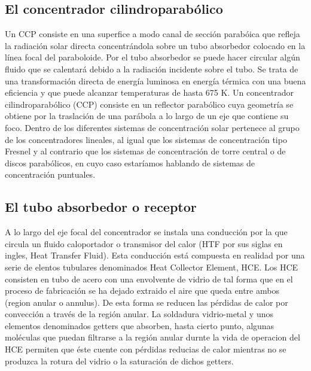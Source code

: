 \subsection{El concentrador cilindroparabólico}
\label{concentrador}
Un CCP consiste en una superfice a modo canal  de sección parabóica que refleja la radiación solar directa
concentrándola sobre un tubo absorbedor colocado en la línea focal del paraboloide. Por el tubo
absorbedor se puede hacer circular algún fluido que se calentará debido a la radiación incidente
sobre el tubo.  Se trata de una transformación directa de energía luminosa en energía
térmica con una buena eficiencia y que puede alcanzar temperaturas de hasta 675 K.
Un concentrador cilindroparabólico (CCP) consiste en un reflector parabólico cuya geometría se obtiene por la traslación de una parábola a lo largo de un eje que contiene su foco. Dentro de los diferentes sistemas de concentración solar pertenece al grupo de los concentradores lineales, al igual que los sistemas de concentración tipo Fresnel y al contrario que los sistemas de concentración de torre central o de discos parabólicos, en cuyo caso estaríamos hablando de sistemas de
concentración puntuales.


\subsection{El tubo absorbedor o receptor}
\label{tuboabsorbedor}
A lo largo del eje focal del concentrador se instala una conducción por la que circula un fluido caloportador o transmisor del calor (HTF por sus siglas en ingles, Heat Transfer Fluid). Esta conducción está compuesta en realidad por una serie de elentos tubulares denominados Heat Collector Element, HCE. Los HCE consisten en tubo de acero con una envolvente de vidrio de tal forma que en el proceso de fabricación se ha dejado extraido el aire que queda entre ambos (region anular o annulus). De esta forma se reducen las pérdidas de calor por convección a través de la región anular. La soldadura vidrio-metal y unos elementos denominados getters que absorben, hasta cierto punto, algunas moléculas que puedan filtrarse a la región anular durnte la vida de operacion del HCE permiten que éste cuente con pérdidas reducias de calor mientras no se produzca la rotura del vidrio o la saturación de dichos getters. 

